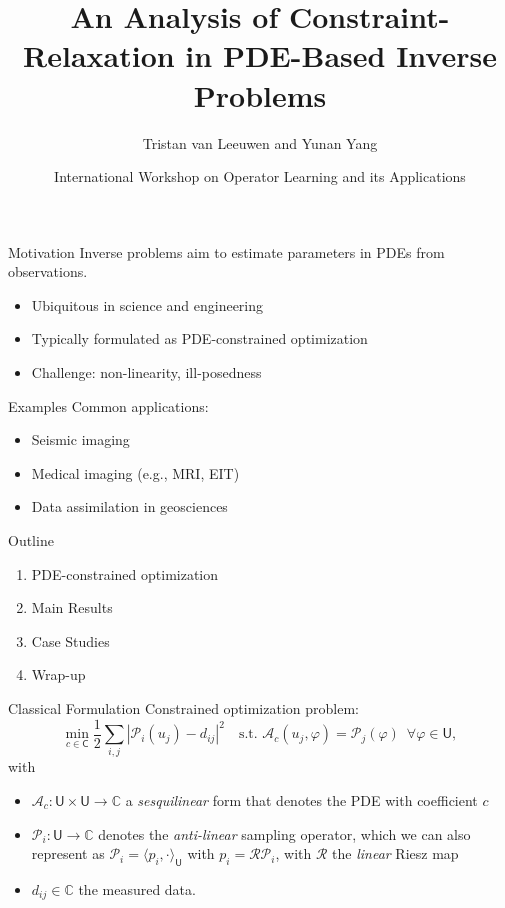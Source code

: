 \documentclass{beamer}
\title[Constraint-Relaxation in PDE Inverse Problems]{An Analysis of Constraint-Relaxation in PDE-Based Inverse Problems}
\author{Tristan van Leeuwen and Yunan Yang}
\date{International Workshop on Operator Learning and its Applications}
\newcommand{\sU}{\mathsf{U}}
\newcommand{\sC}{\mathsf{C}}
\newcommand{\mA}{\mathcal{A}}
\newcommand{\mP}{\mathcal{P}}
\newcommand{\mR}{\mathcal{R}}
\begin{document}
\begin{frame}
  \titlepage
\end{frame}

\begin{frame}{Motivation}
Inverse problems aim to estimate parameters in PDEs from observations.
\begin{itemize}
  \item Ubiquitous in science and engineering
  \item Typically formulated as PDE-constrained optimization
  \item Challenge: non-linearity, ill-posedness
\end{itemize}
\end{frame}

\begin{frame}{Examples}
Common applications:
\begin{itemize}
  \item Seismic imaging
  \item Medical imaging (e.g., MRI, EIT)
  \item Data assimilation in geosciences
\end{itemize}
\end{frame}

\begin{frame}{Outline}
\begin{enumerate}
  \item PDE-constrained optimization
  \item Main Results
  \item Case Studies
  \item Wrap-up
\end{enumerate}
\end{frame}

\begin{frame}{Classical Formulation}
Constrained optimization problem:
\begin{equation*}
\min_{c\in\sC} \frac{1}{2} \sum_{i,j} |\mP_i(u_j) - d_{ij}|^2 \quad \text{s.t. } \mA_c(u_j, \varphi) = \mP_j(\varphi) \,\,\, \forall \varphi \in \sU,
\end{equation*}
with
\begin{itemize}
  \item $\mA_c: \sU\times \sU \rightarrow \mathbb{C}$ a \emph{sesquilinear} form that denotes the PDE with coefficient $c$
  \item $\mP_i : \sU \rightarrow \mathbb{C}$ denotes the \emph{anti-linear} sampling operator, which we can also represent as $\mP_i = \langle p_i,\cdot \rangle_\sU$ with $p_i = \mR \mP_i$, with $\mR$ the \emph{linear} Riesz map
  \item $d_{ij} \in \mathbb{C}$ the measured data. 
\end{itemize}
\end{frame}
\end{document}
